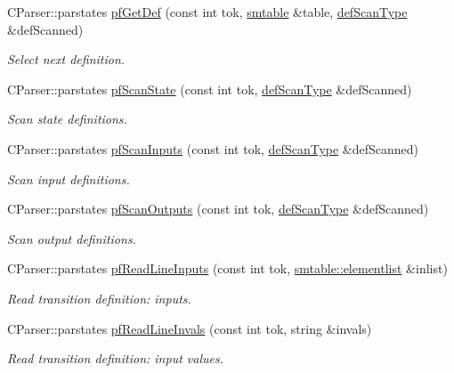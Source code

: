 \begin{DoxyCompactItemize}
C\+Parser\+::parstates \mbox{\hyperlink{class_c_parser_aa29692dcf4992f1954a5b09800eec094}{pf\+Get\+Def}} (const int tok, \mbox{\hyperlink{classsmtable}{smtable}} \&table, \mbox{\hyperlink{struct_c_parser_1_1def_scan_type}{def\+Scan\+Type}} \&def\+Scanned)
\begin{DoxyCompactList}\small\item\em Select next definition. \end{DoxyCompactList}\item 
C\+Parser\+::parstates \mbox{\hyperlink{class_c_parser_a6967b92e7fc37a1906f244d5943a47c4}{pf\+Scan\+State}} (const int tok, \mbox{\hyperlink{struct_c_parser_1_1def_scan_type}{def\+Scan\+Type}} \&def\+Scanned)
\begin{DoxyCompactList}\small\item\em Scan state definitions. \end{DoxyCompactList}\item 
C\+Parser\+::parstates \mbox{\hyperlink{class_c_parser_a95465ac00fca432f665faf76c87126c7}{pf\+Scan\+Inputs}} (const int tok, \mbox{\hyperlink{struct_c_parser_1_1def_scan_type}{def\+Scan\+Type}} \&def\+Scanned)
\begin{DoxyCompactList}\small\item\em Scan input definitions. \end{DoxyCompactList}\item 
C\+Parser\+::parstates \mbox{\hyperlink{class_c_parser_a03bfaa20fdb1042ed4c53ed01d1f8965}{pf\+Scan\+Outputs}} (const int tok, \mbox{\hyperlink{struct_c_parser_1_1def_scan_type}{def\+Scan\+Type}} \&def\+Scanned)
\begin{DoxyCompactList}\small\item\em Scan output definitions. \end{DoxyCompactList}\item 
C\+Parser\+::parstates \mbox{\hyperlink{class_c_parser_a420b7e984e9b8ea91108a91d7f1d4e4c}{pf\+Read\+Line\+Inputs}} (const int tok, \mbox{\hyperlink{classsmtable_a5eb5f5f14b1e52a2bde73255ea71927f}{smtable\+::elementlist}} \&inlist)
\begin{DoxyCompactList}\small\item\em Read transition definition\+: inputs. \end{DoxyCompactList}\item 
C\+Parser\+::parstates \mbox{\hyperlink{class_c_parser_af874200cea410872f02ab466abe165cc}{pf\+Read\+Line\+Invals}} (const int tok, string \&invals)
\begin{DoxyCompactList}\small\item\em Read transition definition\+: input values. \end{DoxyCompactList}\item 

\end{DoxyCompactItemize}
